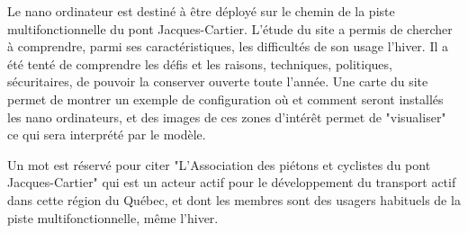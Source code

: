 ﻿\par Le nano ordinateur est destiné à être déployé sur le chemin de la piste multifonctionnelle du pont Jacques-Cartier. L'étude du site a permis de chercher à comprendre, parmi ses caractéristiques, les difficultés de son usage l'hiver. Il a été tenté de comprendre les défis et les raisons, techniques, politiques, sécuritaires, de pouvoir la conserver ouverte toute l'année. Une carte du site permet de montrer un exemple de configuration où et comment seront installés les nano ordinateurs, et des images de ces  zones d'intérêt permet de "visualiser" ce qui sera interprété par le modèle. 
\par Un mot est réservé pour citer "L'Association des piétons et cyclistes du pont Jacques-Cartier" qui est un acteur actif pour le développement du transport actif dans cette région du Québec, et dont les membres sont des usagers habituels de la piste multifonctionnelle, même l'hiver.